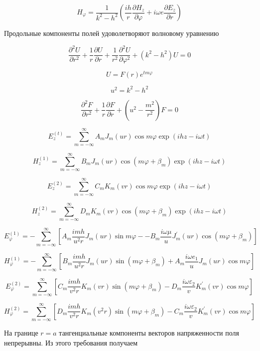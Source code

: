 $$H_{\varphi}=\frac{1}{k^{2}-h^{2}}\left(\frac{i h}{r} \frac{\partial H_{z}}{\partial \varphi}+i \omega e \frac{\partial E_{z}}{\partial r}\right)$$


Продольные компоненты полей удоволетворяют волновому уравнению

$$\frac{\partial^{2} U}{\partial r^{2}}+\frac{1}{r} \frac{\partial U}{\partial r}+\frac{1}{r^{2}} \frac{\partial^{2} U}{\partial \varphi^{2}}+\left(k^{2}-h^{2}\right) U=0$$


$$U=F(r) e^{t m \varphi}$$


$$u^{2}=k^{2}-h^{2}$$

$$\frac{\partial^{2} F}{\partial r^{2}}+\frac{1}{r} \frac{\partial F}{\partial r}+\left(u^{2}-\frac{m^{2}}{r^{2}}\right) F=0$$


$$E_{z}^{(t)}=\sum_{m=-\infty}^{\infty} A_{m} J_{m}(u r) \cos m \varphi \exp (i h z-i \omega t)$$


$$H_{z}^{(1)}=\sum_{m=-\infty}^{\infty} B_{m} J_{m}(u r) \cos \left(m \varphi+\beta_{m}\right) \exp (i h z-i \omega t)$$

$$E_{z}^{(2)}=\sum_{m=-\infty}^{\infty} C_{m} K_{m}(v r) \cos m \varphi \exp (i h z-i \omega t)$$

$$H_{z}^{(2)}=\sum_{m=-\infty}^{\infty} D_{m} K_{m}(v r) \cos \left(m \varphi+\beta_{m}\right) \exp (i h z-i \omega t)$$


$$
E_{\varphi}^{(1)} =-\sum_{m=-\infty}^{\infty}\left[A_{m} \frac{i m h}{u^{2} r} J_{m}(u r) \sin m \varphi-\right.
\left.-B_{m} \frac{i \omega \mu}{u} J_{m}^{\prime}(u r) \cos \left(m \varphi+\beta_{m}\right)\right]
$$

$$
H_{\varphi}^{(1)}=- \sum_{m=-\infty}^{\infty}\left[B_{m} \frac{i m h}{u^{2} r} J_{m}(u r) \sin \left(m \varphi+\beta_{m}\right)+A_{m} \frac{i \omega e_{1}}{u} J_{m}(u r) \cos m \varphi\right]
$$


$$
E_{\varphi}^{(2)}=\sum_{m=-\infty}^{\infty}\left[C_{m} \frac{i m h}{v^{2} r} K_{m}(v r) \sin \left(m \varphi+\beta_{m}\right)-D_{m} \frac{i \omega \varepsilon_{2}}{v} K_{m}^{\prime}(v r) \cos m \varphi\right]
$$

$$
H_{\varphi}^{(2)}= \sum_{m=-\infty}^{\infty}\left[D_{m} \frac{i m h}{v^{2} r} K_{m}\left(v^{2} r\right) \sin \left(m \varphi+\beta_{m}\right)-C_{m} \frac{i \omega \varepsilon_{2}}{v} K_{m}^{\prime}(v r) \cos m \varphi\right]
$$


На границе $ r = a $ тангенциальные компоненты векторов 
напряженности поля непрерывны. Из этого требования  
получаем 


